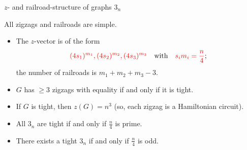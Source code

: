 \documentclass[%
pdf,
colorBG,
slideColor,
]{prosper}
\begin{document}
\begin{slide}{$z$- and railroad-structure of graphs $3_n$}

All zigzags and railroads are simple. 

\begin{itemize}
\item The $z$-vector is of the form 
\begin{equation*}
\textcolor{red}{(4s_1)^{m_1}, (4s_2)^{m_2},(4s_3)^{m_3}}\mbox{~~~with~~~}\textcolor{red}{s_im_i=\frac{n}{4}};
\end{equation*}
the number of railroads is $m_1+m_2+m_3-3$.

\item $G$ has $\geq 3$ zigzags with equality if and only if it is tight.

\item If $G$ is tight, then $z(G)=n^3$ (so, each zigzag is a Hamiltonian circuit).


\item All $3_n$ are tight if and only if $\frac{n}{4}$ is prime.

\item There exists a tight $3_n$ if and only if $\frac{n}{4}$ is odd.
\end{itemize}


\end{slide}
\end{document}
